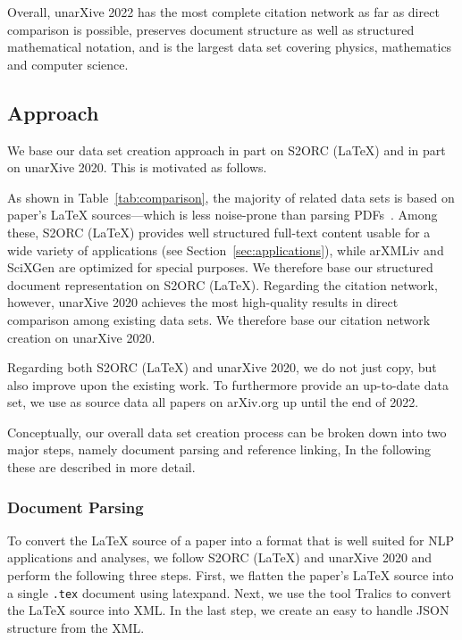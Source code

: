 Overall, unarXive 2022 has the most complete citation network as far as direct comparison is possible, preserves document structure as well as structured mathematical notation, and is the largest data set covering physics, mathematics and computer science.

\subsection{Approach}

We base our data set creation approach in part on S2ORC (\LaTeX{}) and in part on unarXive 2020. This is motivated as follows.

As shown in Table~\ref{tab:comparison}, the majority of related data sets is based on paper's \LaTeX{} sources---which is less noise-prone than parsing PDFs~\cite{Bast2017}. Among these, S2ORC (\LaTeX{}) provides well structured full-text content usable for a wide variety of applications (see Section~\ref{sec:applications}), while arXMLiv and SciXGen are optimized for special purposes. We therefore base our structured document representation on S2ORC (\LaTeX{}). Regarding the citation network, however, unarXive 2020 achieves the most high-quality results in direct comparison among existing data sets. We therefore base our citation network creation on unarXive 2020.

Regarding both S2ORC (\LaTeX{}) and unarXive 2020, we do not just copy, but also improve upon the existing work. To furthermore provide an up-to-date data set, we use as source data all papers on arXiv.org up until the end of 2022.

Conceptually, our overall data set creation process can be broken down into two major steps, namely document parsing and reference linking, In the following these are described in more detail.

\subsubsection{Document Parsing}
To convert the \LaTeX{} source of a paper into a format that is well suited for NLP applications and analyses, we follow S2ORC (\LaTeX{}) and unarXive 2020 and perform the following three steps. First, we flatten the paper's \LaTeX{} source into a single \texttt{.tex} document using latexpand. Next, we use the tool Tralics to convert the \LaTeX{} source into XML. In the last step, we create an easy to handle JSON structure from the XML.

